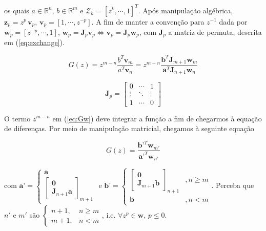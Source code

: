 \documentclass[twoside, fleqn]{article}
\begin{document}
    os quais $a \in \mathbb{R}^n$, $b \in \mathbb{R}^m$ e $\mathcal{Z}_k = \left[z^k, \cdots, 1\right]^T$. Após manipulação algébrica, $\textbf{z}_p = z^p \, \textbf{v}_p$, $\textbf{v}_p = [1, \cdots, z^{-p}]$. A fim de manter a convenção para $z^{-1}$ dada por $\textbf{w}_p =  [z^{-p}, \cdots, 1]$, $\textbf{w}_p = \textbf{J}_p \textbf{v}_p \Leftrightarrow{\textbf{v}_p = \textbf{J}_p \textbf{w}_p}$, com $\textbf{J}_p$ a matriz de permuta, descrita em (\ref{eq:exchange}).
    
        \begin{equation}
            G(z) = z^{m-n}\frac{b^T \textbf{v}_m}{a^T \textbf{v}_n} = z^{m-n} \frac{\textbf{b}^T \textbf{J}_{m+1} \textbf{w}_m}{\textbf{a}^T \textbf{J}_{n+1} \textbf{w}_n}
        \label{eq:Gv}
        \end{equation}
    
        \begin{equation}
            \textbf{J}_p = 
            \begin{bmatrix}
                0&\cdots&1\\
                \vdots & \ddots & \vdots\\
                1&\cdots&0
            \end{bmatrix}
            \label{eq:exchange}
        \end{equation}
    
    O termo $z^{m-n}$ em (\ref{eq:Gw}) deve integrar a função a fim de chegarmos à equação de diferenças. Por meio de manipulação matricial, chegamos à seguinte equação 
    
        \begin{equation}
            G(z) = \frac{\textbf{b'}^T \textbf{w}_{m'}}{\textbf{a'}^T \textbf{w}_{n'}}
            \label{eq:Gw}
        \end{equation}
    
    com $\textbf{a'} = \begin{cases} \textbf{a}\\ \begin{bmatrix} \textbf{0} \\ \textbf{J}_{n+1} \textbf{a} \end{bmatrix}_{m+1} \end{cases} \mbox{ e } \textbf{b'} = \begin{cases} \begin{bmatrix} \textbf{0}\\ \textbf{J}_{m+1} \textbf{b} \end{bmatrix}_{n+1} &, n \geq m \\ \textbf{b} &,  n < m \end{cases}$. Perceba que $n'$ e $m'$ são $\begin{cases} n + 1,& n \geq m \\ m + 1, & n < m \end{cases}$, i.e. $\forall z^p \in \textbf{w} \mbox{, } p \leq 0$. 
    
\end{document}
